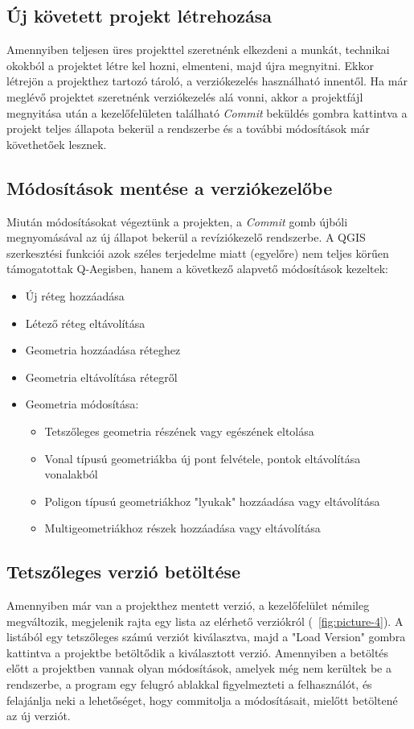 \subsection{Új követett projekt létrehozása}
Amennyiben teljesen üres projekttel szeretnénk elkezdeni a munkát, technikai okokból a projektet létre kel hozni, elmenteni, majd újra megnyitni. Ekkor létrejön a projekthez tartozó tároló, a verziókezelés használható innentől. 
Ha már meglévő projektet szeretnénk verziókezelés alá vonni, akkor a projektfájl megnyitása után a kezelőfelületen található \emph{Commit} beküldés gombra kattintva a projekt teljes állapota bekerül a rendszerbe és a további módosítások már követhetőek lesznek.

\subsection{Módosítások mentése a verziókezelőbe}
Miután módosításokat végeztünk a projekten, a \emph{Commit}  gomb újbóli megnyomásával az új állapot bekerül a revíziókezelő rendszerbe. A QGIS szerkesztési funkciói azok széles terjedelme miatt (egyelőre) nem teljes körűen támogatottak Q-Aegisben, hanem a következő alapvető módosítások kezeltek:
\begin{itemize}
	\item Új réteg hozzáadása
	\item Létező réteg eltávolítása
	\item Geometria hozzáadása réteghez
	\item Geometria eltávolítása rétegről
	\item Geometria módosítása:
	\begin{itemize}
		\item Tetszőleges geometria részének vagy egészének eltolása
		\item Vonal típusú geometriákba új pont felvétele, pontok eltávolítása vonalakból
		\item Poligon típusú geometriákhoz "lyukak" hozzáadása vagy eltávolítása
		\item Multigeometriákhoz részek hozzáadása vagy eltávolítása
	\end{itemize}	
\end{itemize}

\subsection{Tetszőleges verzió betöltése}
Amennyiben már van a projekthez mentett verzió, a kezelőfelület némileg megváltozik, megjelenik rajta egy lista az elérhető verziókról (~\ref{fig:picture-4}). A listából egy tetszőleges számú verziót kiválasztva, majd a "Load Version" gombra kattintva a projektbe betöltődik a kiválasztott verzió. Amennyiben a betöltés előtt a projektben vannak olyan módosítások, amelyek még nem kerültek be a rendszerbe, a program egy felugró ablakkal figyelmezteti a felhasználót, és felajánlja neki a lehetőséget, hogy commitolja a módosításait, mielőtt betöltené az új verziót.

